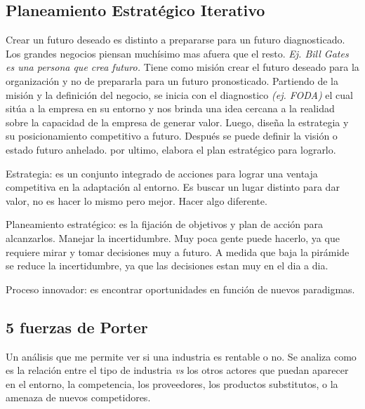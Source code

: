 \documentclass[titlepage,a4paper]{article}
\begin{document}
\subsection{Planeamiento Estratégico Iterativo }
Crear un futuro deseado es distinto a prepararse para un futuro diagnosticado. Los grandes negocios piensan muchísimo mas afuera que el resto. \textit{Ej. Bill Gates es una persona que crea futuro.} Tiene como misión crear el futuro deseado para la organización y no de prepararla para un futuro pronosticado. Partiendo de la misión y la definición del negocio, se inicia con el diagnostico \textit{(ej. FODA)} el cual sitúa a la empresa en su entorno y nos brinda una idea cercana a la realidad sobre la capacidad de la empresa de generar valor. Luego, diseña la estrategia y su posicionamiento competitivo a futuro. Después se puede definir la visión o estado futuro anhelado. por ultimo, elabora el plan estratégico para lograrlo.

    \smallskip

Estrategia: es un conjunto integrado de acciones para lograr una ventaja competitiva en la adaptación al entorno. Es buscar un lugar distinto para dar valor, no es hacer lo mismo pero mejor. Hacer algo diferente.

    \smallskip

Planeamiento estratégico: es la fijación de objetivos y plan de acción para alcanzarlos. Manejar la incertidumbre. Muy poca gente puede hacerlo, ya que requiere mirar y tomar decisiones muy a futuro. A medida que baja la pirámide se reduce la incertidumbre, ya que las decisiones estan muy en el dia a dia.

    \smallskip

Proceso innovador: es encontrar oportunidades en función de nuevos paradigmas.

\subsection{5 fuerzas de Porter}
Un análisis que me permite ver si una industria es rentable o no. Se analiza como es la relación entre el tipo de industria \textit{vs} los otros actores que puedan aparecer en el entorno, la competencia, los proveedores, los productos substitutos, o la amenaza de nuevos competidores. 
\end{document}
